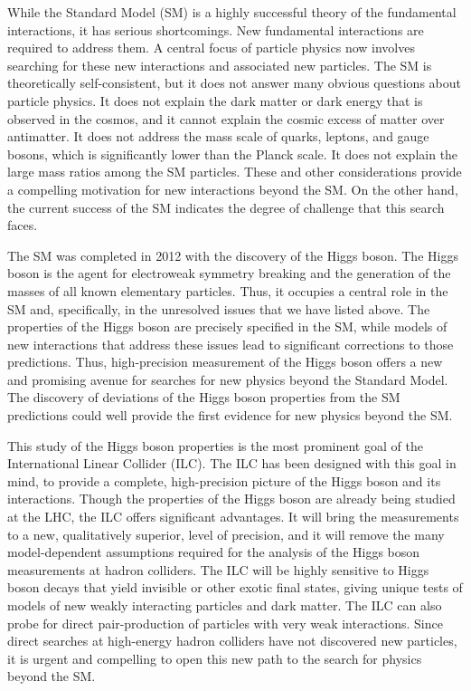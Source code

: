 
While the Standard Model (SM) is a highly successful theory of
the fundamental interactions, it has serious shortcomings. New
fundamental interactions are 
required to address them.   A central focus of particle physics
now involves
searching for these new interactions and associated new particles.  
The SM is theoretically
 self-consistent, but it does not answer many obvious questions about
 particle physics.  It does not explain the 
dark matter or dark energy
that is observed in the cosmos,
and it cannot explain the cosmic excess of matter over antimatter.   It does
not address the mass scale of quarks, leptons, and gauge 
bosons, which is significantly lower than the Planck scale.   
It does not explain
the large mass ratios among the SM particles.   
These and other considerations provide a compelling motivation
for new interactions beyond the SM.   On the other hand,
the current success of the SM indicates
the degree of challenge that  this search faces.

The SM was completed in 2012 with the discovery of the Higgs boson.
The Higgs boson is the agent for  electroweak symmetry breaking
and the generation of the masses of all known elementary
particles.  Thus, it occupies a central role in the SM and,
specifically, in the unresolved issues that we have listed above. 
 The properties of the Higgs boson are precisely specified
in the SM, while models of new interactions that address these issues
lead to
significant corrections to those predictions.  Thus, high-precision
measurement of the Higgs boson offers a new and promising 
 avenue for searches for
new physics beyond the Standard Model.   The discovery of deviations
of the Higgs boson properties from the SM predictions could well
provide the first evidence for new physics beyond the SM. 
 
This study of the Higgs boson properties is the most prominent goal of
the International Linear Collider (ILC).   The ILC has been designed
with this goal in mind, to provide a complete, high-precision picture
of the Higgs boson and its interactions.  Though the properties of the
Higgs boson are already being studied at the LHC, the ILC offers
significant advantages.  It will bring the measurements
to a new, qualitatively superior, level of precision, and it will
remove the many model-dependent assumptions required for the analysis
of the Higgs boson measurements at hadron colliders.   The ILC will be highly
sensitive to Higgs boson decays that yield invisible or
other exotic final states, giving unique tests of models of new weakly
interacting particles and dark matter. The ILC can also probe for
direct pair-production of particles with very weak interactions.  Since direct searches
at high-energy hadron colliders have not discovered new particles, it
is urgent and compelling to open this new path to the search for
physics beyond the SM.

